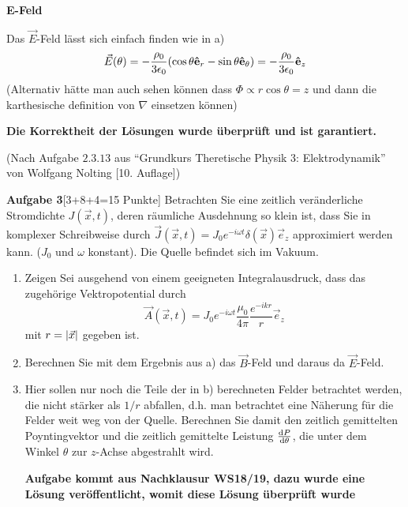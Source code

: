 \begin{enumerate}[label=\alph*)]
    \textbf{E-Feld}
    
    Das $\vec E$-Feld lässt sich einfach finden wie in a)
    \begin{equation}
      \vec E(\theta) = -\frac{\rho_0}{3\epsilon_0}
      \qty(\cos\theta \vu e_r - \sin\theta \vu e_\theta) 
      =-\frac{\rho_0}{3\epsilon_0}\vu e_z
    \end{equation}
    (Alternativ hätte man auch sehen können dass 
    $\Phi\propto r\cos\theta=z$ und dann die karthesische definition von
    $\nabla$ einsetzen können)

    \vfill
    \textbf{Die Korrektheit der Lösungen 
      wurde überprüft und ist garantiert.}

    (Nach Aufgabe $2.3.13$ aus
    ``Grundkurs Theretische Physik 3: Elektrodynamik'' von Wolfgang Nolting
    [10. Auflage])

\end{enumerate}

\newpage
\setcounter{equation}{0}
\textbf{Aufgabe 3}\hfill[3+8+4=15 Punkte]
Betrachten Sie eine zeitlich veränderliche Stromdichte $J(\vec x,t)$, deren
räumliche Ausdehnung so klein ist, dass Sie in komplexer Schreibweise durch
$\vec J(\vec x,t)=J_0 e^{-i\omega t}\delta(\vec x)\vec e_z$ approximiert
werden kann. ($J_0$ und $\omega$ konstant). Die Quelle befindet sich 
im Vakuum.
\begin{enumerate}[label=\alph*)]
  \item Zeigen Sei ausgehend von einem geeigneten Integralausdruck, dass
    das zugehörige Vektropotential durch
    \begin{equation*}
      \vec A(\vec x, t)
      =J_0 e^{-i\omega t}\frac{\mu_0}{4\pi}\frac{e^{-ikr}}{r}\vec e_z
    \end{equation*}
    mit $r=\abs{\vec x}$ gegeben ist.

  \item Berechnen Sie mit dem Ergebnis aus a) das $\vec B$-Feld und
    daraus da $\vec E$-Feld.

  \item Hier sollen nur noch die Teile der in b) berechneten Felder
    betrachtet werden, die nicht stärker als $1/r$ abfallen, d.h. man
    betrachtet eine Näherung für die Felder weit weg von der Quelle.
    Berechnen Sie damit den zeitlich gemittelten Poyntingvektor und
    die zeitlich gemittelte Leistung $\dv {P}{\theta}$, die unter dem
    Winkel $\theta$ zur $z$-Achse abgestrahlt wird.

  \textbf{Aufgabe kommt aus Nachklausur WS18/19, dazu wurde eine
  Lösung veröffentlicht, womit diese Lösung überprüft wurde}
\end{enumerate}


